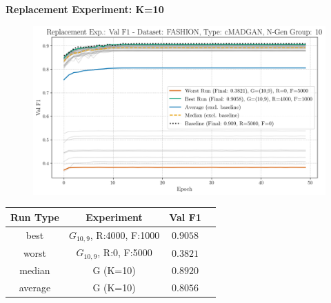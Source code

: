 \noindent\textbf{Replacement Experiment: K=10}
\begin{figure}[htbp]
	\centering
	\includegraphics[width=.85\textwidth]{abb/strat_classifier_performance/FASHION_STRATIFIED_CLASSIFIERS_cMADGAN_NEW/replacement_experiments/val_f1_score_cMADGAN_FASHION_n_gen_10_all.png}
	\label{fig:app_strat_class_performance_replacement_exp._val_f1_score_10}
\end{figure}
\begin{table}[H]
	\vspace{-1em}
	\centering
	\begin{tabular}{|c|c|c|c|}
		\hline
		Run Type & Experiment & Val F1 \\ \hline
		best & \(G_{10, 9}\), R:4000, F:1000 & $0.9058$\\ \hline
		worst & \(G_{10, 9}\), R:0, F:5000 & $0.3821$\\ \hline
		median & G (K=10) & $0.8920$\\ \hline
		average & G (K=10) & $0.8056$
		\\ \hline
	\end{tabular}
\end{table}
\newpage

